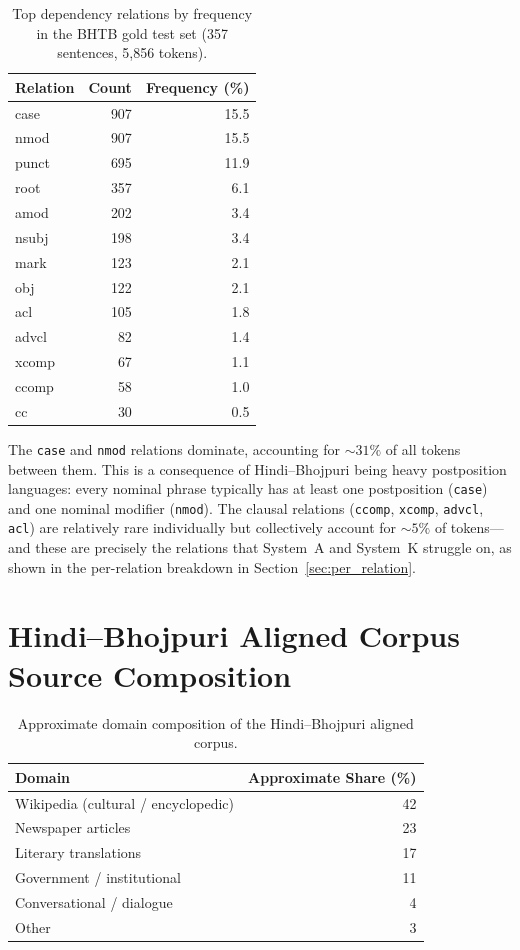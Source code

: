 \documentclass[12pt,a4paper,oneside]{report}
\begin{document}
\begin{table}[ht]
\centering
\caption{Top dependency relations by frequency in the BHTB gold test set (357 sentences, 5{,}856 tokens).}
\label{tab:bhtb_deprel}
\begin{tabular}{@{}lrr@{}}
\toprule
\textbf{Relation} & \textbf{Count} & \textbf{Frequency (\%)} \\
\midrule
case      & 907 & 15.5 \\
nmod      & 907 & 15.5 \\
punct     & 695 & 11.9 \\
root      & 357 &  6.1 \\
amod      & 202 &  3.4 \\
nsubj     & 198 &  3.4 \\
mark      & 123 &  2.1 \\
obj       & 122 &  2.1 \\
acl       & 105 &  1.8 \\
advcl     &  82 &  1.4 \\
xcomp     &  67 &  1.1 \\
ccomp     &  58 &  1.0 \\
cc        &  30 &  0.5 \\
\bottomrule
\end{tabular}
\end{table}

The \texttt{case} and \texttt{nmod} relations dominate, accounting for
${\sim}31\%$ of all tokens between them. This is a consequence of Hindi--Bhojpuri
being heavy postposition languages: every nominal phrase typically has at
least one postposition (\texttt{case}) and one nominal modifier
(\texttt{nmod}). The clausal relations (\texttt{ccomp}, \texttt{xcomp},
\texttt{advcl}, \texttt{acl}) are relatively rare individually but
collectively account for ${\sim}5\%$ of tokens---and these are precisely the
relations that System~A and System~K struggle on, as shown in the
per-relation breakdown in Section~\ref{sec:per_relation}.

\section{Hindi--Bhojpuri Aligned Corpus Source Composition}

\begin{table}[ht]
\centering
\caption{Approximate domain composition of the Hindi--Bhojpuri aligned corpus.}
\label{tab:aligned_sources}
\begin{tabular}{@{}lr@{}}
\toprule
\textbf{Domain} & \textbf{Approximate Share (\%)} \\
\midrule
Wikipedia (cultural / encyclopedic) & 42 \\
Newspaper articles                  & 23 \\
Literary translations               & 17 \\
Government / institutional          & 11 \\
Conversational / dialogue           &  4 \\
Other                                &  3 \\
\bottomrule
\end{tabular}
\end{table}
\end{document}
